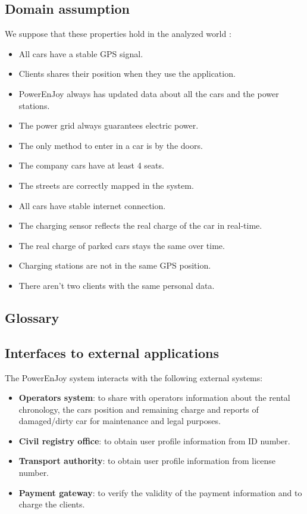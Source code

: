 \subsection{Domain assumption}
We suppose that these properties hold in the analyzed world :
\begin{itemize}
\item All cars have a stable GPS signal.
\item Clients shares their position when they use the application.
\item PowerEnJoy always has updated data about all the cars and the power stations.
\item The power grid always guarantees electric power.
\item The only method to enter in a car is by the doors.
\item The company cars have at least 4 seats.
\item The streets are correctly mapped in the system.
\item All cars have stable internet connection.
\item The charging sensor reflects the real charge of the car in real-time.
\item The real charge of parked cars stays the same over time. 
\item  Charging stations are not in the same GPS position.
\item  There aren't two clients with the same  personal data.
\end{itemize}

\newpage

\subsection{Glossary}


\subsection{Interfaces to external applications}
The PowerEnJoy system interacts with the following external systems:
\begin{itemize}
\item \textbf{Operators system}: to share with operators information about the rental chronology, the cars position and remaining charge and reports of damaged/dirty car for maintenance and legal purposes. 
\item  \textbf{Civil registry office}: to obtain user profile information from ID number.
\item \textbf{Transport authority}:  to obtain user profile information from license number.
\item \textbf{Payment gateway}: to verify the validity of the payment information and to charge the clients. 
\end{itemize}


